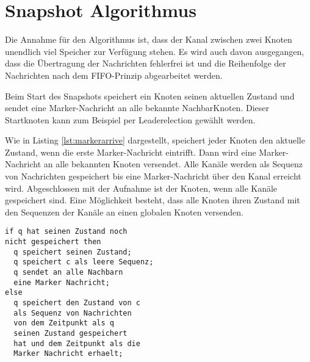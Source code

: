 \section{Snapshot Algorithmus}
\label{sec:snapshotalg}
Die Annahme für den Algorithmus ist, dass der Kanal zwischen zwei Knoten unendlich
viel Speicher zur Verfügung stehen. Es wird auch davon ausgegangen, dass die
Übertragung der Nachrichten fehlerfrei ist und die Reihenfolge der Nachrichten
nach dem FIFO-Prinzip abgearbeitet werden.

Beim Start des Snapshots speichert ein Knoten seinen aktuellen Zustand und sendet 
eine Marker-Nachricht an alle bekannte NachbarKnoten. Dieser Startknoten kann
zum Beispiel per Leaderelection gewählt werden.

Wie in Listing \ref{lst:markerarrive} dargestellt, speichert jeder Knoten den
aktuelle Zustand, wenn die erste Marker-Nachricht eintrifft. Dann wird eine
Marker-Nachricht an alle bekannten Knoten versendet.  Alle Kanäle werden als
Sequenz von Nachrichten gespeichert bis eine Marker-Nachricht über den Kanal
erreicht wird. Abgeschlossen mit der Aufnahme ist der Knoten, wenn alle Kanäle
gespeichert sind.  Eine Möglichkeit besteht, dass alle Knoten ihren Zustand mit
den Sequenzen der Kanäle an einen globalen Knoten versenden.

\begin{lstlisting}[caption={Pseudo Ablauf, wenn Marker Nachricht über den Kanal c den Knoten q erreicht. \cite{snapshotChandyLamport}}, label=lst:markerarrive]
if q hat seinen Zustand noch
nicht gespeichert then
  q speichert seinen Zustand;
  q speichert c als leere Sequenz;
  q sendet an alle Nachbarn
  eine Marker Nachricht;
else
  q speichert den Zustand von c
  als Sequenz von Nachrichten
  von dem Zeitpunkt als q
  seinen Zustand gespeichert
  hat und dem Zeitpunkt als die
  Marker Nachricht erhaelt;
\end{lstlisting}
